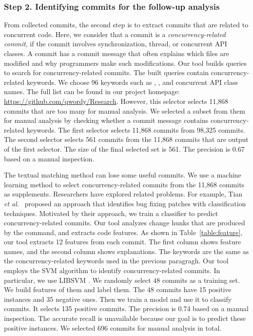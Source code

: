 \subsubsection{Step 2. Identifying commits for the follow-up analysis} From collected commits, the second step is to extract commits that are related to concurrent code. Here, we consider that a commit is a  \emph{concurrency-related commit}, if the commit involves synchronization, thread, or concurrent API classes. A commit has a commit message that often explains which files are modified and why programmers make such modifications. Our tool builds queries to search for concurrency-related commits. The built queries contain concurrency-related keywords. We choose 96 keywords such as , , and concurrent API class names. The full list can be found in our project homepage: \url{https://github.com/qwordy/Research}. However, this selector selects 11,868 commits that are too many for manual analysis. We selected a subset from them for manual analysis by checking whether a commit message contains concurrency-related keywords. The first selector selects 11,868 commits from 98,325 commits. The second selector selects 561 commits from the 11,868 commits that are output of the first selector. The size of the final selected set is 561. The precision is 0.67 based on a manual inspection.

The textual matching method can lose some useful commits. We use a machine learning method to select concurrency-related commits from the 11,868 commits as supplements. Researchers have explored related problems. For example, Tian \emph{et al.}~\cite{tian2012identifying} proposed an approach that identifies bug fixing patches with classification techniques. Motivated by their approach, we train a classifier to predict concurrency-related commits. Our tool analyzes change hunks that are produced by the  command, and extracts code features. As shown in Table~\ref{table:feature}, our tool extracts 12 features from each commit. The first column shows feature names, and the second column shows explanations. The keywords are the same as the concurrency-related keywords used in the previous paragragh. Our tool employs the SVM \cite{journals/ml/CortesV95} algorithm to identify concurrency-related commits. In particular, we use LIBSVM \cite{libsvm}. We randomly select 48 commits as a training set. We build features of them and label them. The 48 commits have 15 positive instances and 35 negative ones. Then we train a model and use it to classify commits. It selects 135 positive commits. The precision is 0.74 based on a manual inspection. The accurate recall is unavailable because our goal is to predict these positive instances.
We selected 696 commits for manual analysis in total.


